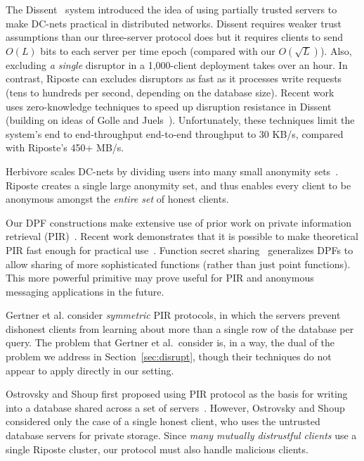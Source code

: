 \documentclass[10pt,twocolumn]{article}
\newcommand{\name}{Riposte\xspace}
\newcommand{\Name}{Riposte\xspace}
\begin{document}
The Dissent~\cite{wolinsky2012dissent} system
introduced the idea of using partially trusted servers to 
make DC-nets practical in distributed networks. 
Dissent requires weaker trust assumptions than our three-server
protocol does but it requires clients to send $O(L)$ bits
to each server per time epoch (compared with our $O(\sqrt{L})$).
Also, excluding {\em a single} disruptor in a 1,000-client
deployment takes over an hour.
In contrast, \name can excludes disruptors as fast as it processes write
requests (tens to hundreds per second, depending on the database size).
Recent work~\cite{corrigangibbs2013proactively} uses
zero-knowledge techniques to speed up disruption resistance
in Dissent (building on ideas of Golle and Juels~\cite{golle2004dining}).
Unfortunately, these techniques limit the system's end to end-throughput
end-to-end throughput to 30 KB/s, compared with \name's 450+ MB/s.

Herbivore scales DC-nets by dividing users into many small anonymity
sets~\cite{goel2003herbivore}.
\Name creates a single large anonymity set, and thus enables
every client to be anonymous amongst the {\em entire set} of honest clients.




Our DPF constructions make extensive use
of prior work on private information
retrieval (PIR)~\cite{chor1998private,chor1997computationally,gasarch2004survey,gilboa2014distributed}.
Recent work demonstrates that it is possible to make
theoretical PIR fast enough for practical 
use~\cite{devet2014best,goldberg2007improving,demmler2014raid}.
Function secret sharing~\cite{boyle2015function} generalizes DPFs
to allow sharing of more sophisticated functions (rather than just
point functions).
This more powerful primitive may prove useful for PIR and anonymous
messaging applications in the future.

Gertner et al.\cite{gertner1998protecting} consider {\em symmetric}
PIR protocols, in which the servers prevent dishonest clients
from learning about more than a single row of the database per query.
The problem that Gertner et al.\ consider is, in a way, the dual 
of the problem we address in Section~\ref{sec:disrupt}, though
their techniques do not appear to apply directly in our setting.

Ostrovsky and Shoup first proposed
using PIR protocol as the basis for writing
into a database shared across a set of servers~\cite{ostrovsky1997private}.
However, Ostrovsky and Shoup
considered only the case of a single honest client, 
who uses the untrusted database servers for private storage. 
Since {\em many mutually distrustful clients} use a
single \name cluster, our protocol must also handle malicious clients.
\end{document}

